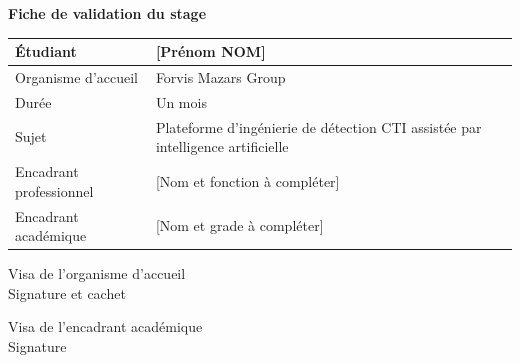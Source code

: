 \thispagestyle{empty}
\begin{center}
{\Large\bfseries Fiche de validation du stage}
\end{center}

\vspace{1.5cm}

\begin{tabular}{|p{}|p{}|}
\hline
Étudiant & [Prénom NOM] \\
\hline
Organisme d'accueil & Forvis Mazars Group \\
\hline
Durée & Un mois \\
\hline
Sujet & Plateforme d'ingénierie de détection CTI assistée par intelligence artificielle \\
\hline
Encadrant professionnel & [Nom et fonction à compléter] \\
\hline
Encadrant académique & [Nom et grade à compléter] \\
\hline
\end{tabular}

\vspace{2.5cm}

\begin{minipage}[t]{0.45\textwidth}
\centering
Visa de l'organisme d'accueil\\[2.5cm]
Signature et cachet
\end{minipage}
\hfill
\begin{minipage}[t]{0.45\textwidth}
\centering
Visa de l'encadrant académique\\[2.5cm]
Signature
\end{minipage}

\clearpage